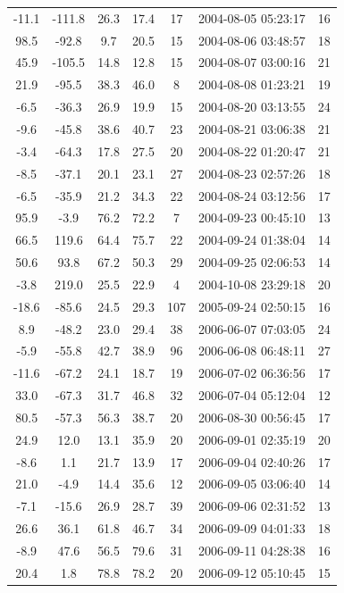 \documentclass[12pt,a4paper]{report}
\begin{document}
\begin{longtable}{|c|c|c|c|c|c|c|}
-11.1 & -111.8 & 26.3 & 17.4 &  17 & 2004-08-05 05:23:17 &  16 \\
98.5 & -92.8 & 9.7 & 20.5 &  15 & 2004-08-06 03:48:57 &  18 \\
45.9 & -105.5 & 14.8 & 12.8 &  15 & 2004-08-07 03:00:16 &  21 \\
21.9 & -95.5 & 38.3 & 46.0 &   8 & 2004-08-08 01:23:21 &  19 \\
-6.5 & -36.3 & 26.9 & 19.9 &  15 & 2004-08-20 03:13:55 &  24 \\
-9.6 & -45.8 & 38.6 & 40.7 &  23 & 2004-08-21 03:06:38 &  21 \\
-3.4 & -64.3 & 17.8 & 27.5 &  20 & 2004-08-22 01:20:47 &  21 \\
-8.5 & -37.1 & 20.1 & 23.1 &  27 & 2004-08-23 02:57:26 &  18 \\
-6.5 & -35.9 & 21.2 & 34.3 &  22 & 2004-08-24 03:12:56 &  17 \\
95.9 & -3.9 & 76.2 & 72.2 &   7 & 2004-09-23 00:45:10 &  13 \\
66.5 & 119.6 & 64.4 & 75.7 &  22 & 2004-09-24 01:38:04 &  14 \\
50.6 & 93.8 & 67.2 & 50.3 &  29 & 2004-09-25 02:06:53 &  14 \\
-3.8 & 219.0 & 25.5 & 22.9 &   4 & 2004-10-08 23:29:18 &  20 \\
-18.6 & -85.6 & 24.5 & 29.3 & 107 & 2005-09-24 02:50:15 &  16 \\
8.9 & -48.2 & 23.0 & 29.4 &  38 & 2006-06-07 07:03:05 &  24 \\
-5.9 & -55.8 & 42.7 & 38.9 &  96 & 2006-06-08 06:48:11 &  27 \\
-11.6 & -67.2 & 24.1 & 18.7 &  19 & 2006-07-02 06:36:56 &  17 \\
33.0 & -67.3 & 31.7 & 46.8 &  32 & 2006-07-04 05:12:04 &  12 \\
80.5 & -57.3 & 56.3 & 38.7 &  20 & 2006-08-30 00:56:45 &  17 \\
24.9 & 12.0 & 13.1 & 35.9 &  20 & 2006-09-01 02:35:19 &  20 \\
-8.6 & 1.1 & 21.7 & 13.9 &  17 & 2006-09-04 02:40:26 &  17 \\
21.0 & -4.9 & 14.4 & 35.6 &  12 & 2006-09-05 03:06:40 &  14 \\
-7.1 & -15.6 & 26.9 & 28.7 &  39 & 2006-09-06 02:31:52 &  13 \\
26.6 & 36.1 & 61.8 & 46.7 &  34 & 2006-09-09 04:01:33 &  18 \\
-8.9 & 47.6 & 56.5 & 79.6 &  31 & 2006-09-11 04:28:38 &  16 \\
20.4 & 1.8 & 78.8 & 78.2 &  20 & 2006-09-12 05:10:45 &  15 \\

\end{longtable}
\end{document}
